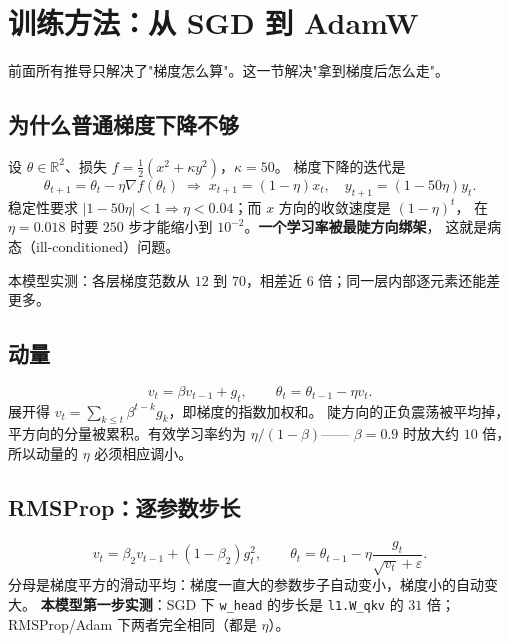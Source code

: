 \chapter{训练方法：从 SGD 到 AdamW}
前面所有推导只解决了"梯度怎么算"。这一节解决"拿到梯度后怎么走"。

\section{为什么普通梯度下降不够}

设 $\theta\in\mathbb{R}^2$、损失 $f=\tfrac12(x^2+\kappa y^2)$，$\kappa=50$。
梯度下降的迭代是
\begin{equation}
  \theta_{t+1}=\theta_t-\eta\nabla f(\theta_t)
  \;\Longrightarrow\;
  x_{t+1}=(1-\eta)x_t,\quad y_{t+1}=(1-50\eta)y_t .
\end{equation}
稳定性要求 $|1-50\eta|<1\Rightarrow\eta<0.04$；而 $x$ 方向的收敛速度是 $(1-\eta)^t$，
在 $\eta=0.018$ 时要 $250$ 步才能缩小到 $10^{-2}$。\textbf{一个学习率被最陡方向绑架}，
这就是病态（ill-conditioned）问题。

本模型实测：各层梯度范数从 $12$ 到 $70$，相差近 $6$ 倍；同一层内部逐元素还能差更多。

\section{动量}

\begin{equation}
  v_t=\beta v_{t-1}+g_t,\qquad \theta_t=\theta_{t-1}-\eta v_t .
\end{equation}
展开得 $v_t=\sum_{k\le t}\beta^{t-k}g_k$，即梯度的指数加权和。
陡方向的正负震荡被平均掉，平方向的分量被累积。有效学习率约为 $\eta/(1-\beta)$——
$\beta=0.9$ 时放大约 $10$ 倍，所以动量的 $\eta$ 必须相应调小。

\section{RMSProp：逐参数步长}

\begin{equation}
  v_t=\beta_2v_{t-1}+(1-\beta_2)g_t^2,\qquad
  \theta_t=\theta_{t-1}-\eta\frac{g_t}{\sqrt{v_t}+\varepsilon} .
\end{equation}
分母是梯度平方的滑动平均：梯度一直大的参数步子自动变小，梯度小的自动变大。
\textbf{本模型第一步实测}：SGD 下 \texttt{w\_head} 的步长是 \texttt{l1.W\_qkv} 的
$31$ 倍；RMSProp/Adam 下两者完全相同（都是 $\eta$）。

